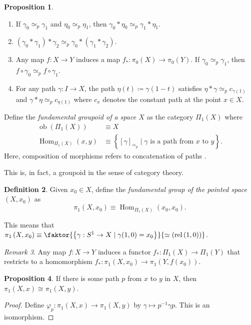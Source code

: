 \documentclass[10pt,letterpaper,cm]{nupset}
\theoremstyle{definition}
\newtheorem{definition}{Definition}[subsection]
\theoremstyle{theorem}
\newtheorem{prop}[definition]{Proposition}
\theoremstyle{remark}
\newtheorem{remark}[definition]{Remark}
\newcommand{\1}{\mathbb{1}}
\newcommand{\0}{\vec 0}
\DeclareMathOperator{\Hom}{Hom}
\DeclareMathOperator{\ob}{ob}
\DeclareMathOperator{\rel}{rel}
\begin{document}
\begin{prop} $ $
\begin{enumerate}
\item If $\gamma_0 \simeq_p \gamma_1$ and $\eta_0 \simeq_p \eta_1$, then $\gamma_0 \ast \eta_0 \simeq_p \gamma_1 \ast \eta_1$.
\item $\left(\gamma_0 \ast \gamma_1\right)\ast \gamma_2 \simeq_p \gamma_0 \ast \left(\gamma_1 \ast \gamma_2\right)$.
\item Any map $f: X \to Y$ induces a map $f_{\ast} : \pi_0(X) \to \pi_0(Y)$. If $\gamma_0 \simeq_p \gamma_1$, then $f\circ \gamma_0 \simeq_p f\circ \gamma_1$.
\item For any path $\gamma : I \to X$, the path $\eta(t) \coloneqq  \gamma(1-t)$ satisfies $\eta \ast \gamma \simeq_p c_{\gamma(1)}$ and $\gamma \ast \eta \simeq_p c_{\eta(1)}$ where $c_x$ denotes the constant path at the point $x\in X$.
\end{enumerate}
\end{prop}


\smallskip

Define the \textit{fundamental groupoid of a space $X$} as the category $\Pi_1(X)$ where
\begin{align*}
\ob(\Pi_1(X)) & \equiv X
\\ \Hom_{\Pi_1(X)}(x,y) & \equiv \left\{[\gamma]_{\simeq_p} \mid \gamma \text{ is a path from }x \text{ to }y\right\}.
\end{align*}
 Here, composition of morphisms refers to concatenation of paths . 



This is, in fact, a groupoid in the sense of category theory.


\begin{definition}
Given $x_0 \in X$, define the \textit{fundamental group of the pointed space $\left(X, x_0\right)$} as $$\pi_1\left(X, x_0\right) \equiv \Hom_{\Pi_1(X)}(x_0,x_0) .$$ 
\end{definition}

This means that $\pi_1\left(X, x_0\right) \equiv  \faktor{\left\{\gamma : S^1 \to X \mid \gamma(1,0) =x_0\right\}}{\simeq \left(\rel{ \left(1,0\right)}\right)}$.

\begin{remark}
Any map $f: X \to Y$ induces a functor $f_{\ast} : \Pi_1(X) \to \Pi_1(Y)$ that restricts to a homomorphism $f_{\ast} : \pi_1\left(X, x_0\right) \to \pi_1(Y, f(x_0))$.
\end{remark}

\begin{prop}
If there is some path $p$ from $x$ to $y$ in $X$, then $\pi_1(X, x) \cong \pi_1(X, y)$.
\end{prop}
\begin{proof}
Define $\varphi_p : \pi_1(X, x) \to \pi_1(X, y)$ by $\gamma \mapsto p^{-1} \gamma p$. This is an isomorphism. 
\end{proof}
\end{document}
